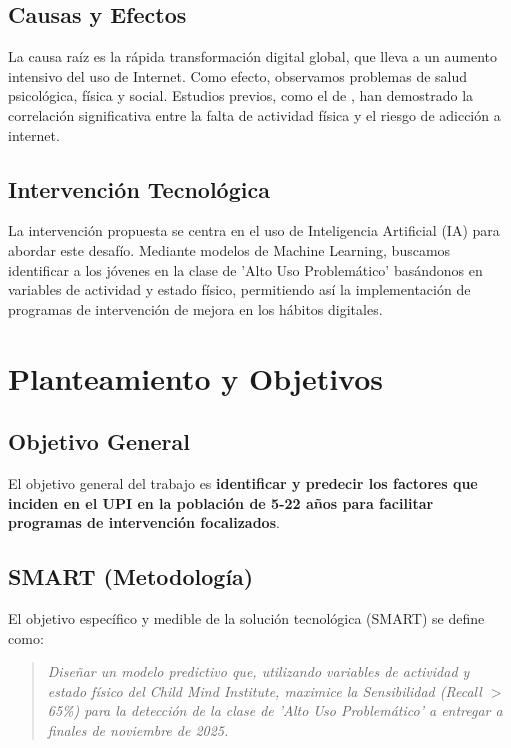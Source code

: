 \documentclass[conference]{IEEEtran}
\begin{document}
	\subsection{Causas y Efectos}
	
	La causa raíz es la rápida transformación digital global, que lleva a un aumento intensivo del uso de Internet. Como efecto, observamos problemas de salud psicológica, física y social. Estudios previos, como el de \cite{referencia3}, han demostrado la correlación significativa entre la falta de actividad física y el riesgo de adicción a internet. 
	
	\subsection{Intervención Tecnológica}
	
	La intervención propuesta se centra en el uso de Inteligencia Artificial (IA) para abordar este desafío. Mediante modelos de Machine Learning, buscamos identificar a los jóvenes en la clase de 'Alto Uso Problemático' basándonos en variables de actividad y estado físico, permitiendo así la implementación de programas de intervención de mejora en los hábitos digitales.
	
	\section{Planteamiento y Objetivos}
	\label{sec:objetivos}
	
	
	
	\subsection{Objetivo General}
	
	El objetivo general del trabajo es \textbf{identificar y predecir los factores que inciden en el UPI en la población de 5-22 años para facilitar programas de intervención focalizados}.
	
	\subsection{SMART (Metodología)}
	
	El objetivo específico y medible de la solución tecnológica (SMART) se define como:
	
	\begin{quote}
		\textit{Diseñar un modelo predictivo que, utilizando variables de actividad y estado físico del Child Mind Institute, maximice la Sensibilidad (Recall $>$ 65\%) para la detección de la clase de 'Alto Uso Problemático' a entregar a finales de noviembre de 2025.}
	\end{quote}
	
\end{document}
